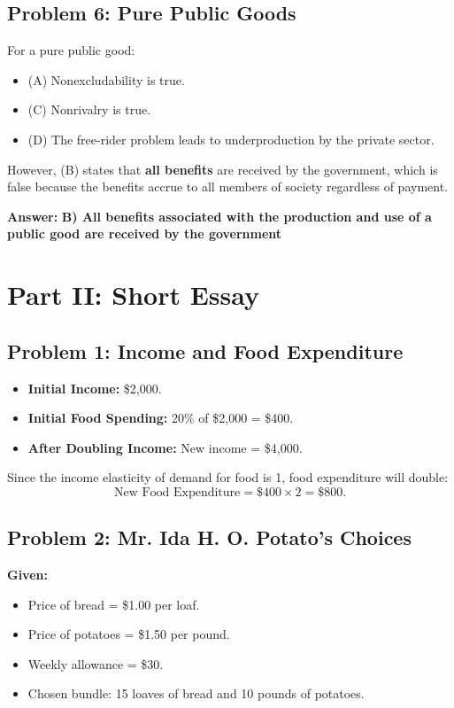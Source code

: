 \documentclass[12pt]{article}
\begin{document}
\subsection*{Problem 6: Pure Public Goods}
For a pure public good:
\begin{itemize}[noitemsep]
    \item (A) Nonexcludability is true.
    \item (C) Nonrivalry is true.
    \item (D) The free-rider problem leads to underproduction by the private sector.
\end{itemize}
However, (B) states that \textbf{all benefits} are received by the government, which is false because the benefits accrue to all members of society regardless of payment.

\textbf{Answer:} \textbf{B) All benefits associated with the production and use of a public good are received by the government}

\newpage
\section*{Part II: Short Essay}

\subsection*{Problem 1: Income and Food Expenditure}
\begin{itemize}[noitemsep]
    \item \textbf{Initial Income:} \$2,000.
    \item \textbf{Initial Food Spending:} 20\% of \$2,000 = \$400.
    \item \textbf{After Doubling Income:} New income = \$4,000.
\end{itemize}
Since the income elasticity of demand for food is 1, food expenditure will double:
\[
    \text{New Food Expenditure} = \$400 \times 2 = \$800.
\]

\subsection*{Problem 2: Mr. Ida H. O. Potato’s Choices}
\textbf{Given:}
\begin{itemize}[noitemsep]
    \item Price of bread = \$1.00 per loaf.
    \item Price of potatoes = \$1.50 per pound.
    \item Weekly allowance = \$30.
    \item Chosen bundle: 15 loaves of bread and 10 pounds of potatoes.
\end{itemize}
\end{document}
